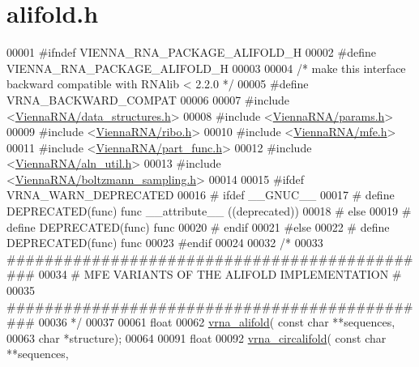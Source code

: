 \hypertarget{alifold_8h_source}{}\section{alifold.\+h}
\label{alifold_8h_source}

\begin{DoxyCode}
00001 \textcolor{preprocessor}{#ifndef VIENNA\_RNA\_PACKAGE\_ALIFOLD\_H}
00002 \textcolor{preprocessor}{#define VIENNA\_RNA\_PACKAGE\_ALIFOLD\_H}
00003 
00004 \textcolor{comment}{/* make this interface backward compatible with RNAlib < 2.2.0 */}
00005 \textcolor{preprocessor}{#define VRNA\_BACKWARD\_COMPAT}
00006 
00007 \textcolor{preprocessor}{#include <\hyperlink{data__structures_8h}{ViennaRNA/data\_structures.h}>}
00008 \textcolor{preprocessor}{#include <\hyperlink{params_8h}{ViennaRNA/params.h}>}
00009 \textcolor{preprocessor}{#include <\hyperlink{ribo_8h}{ViennaRNA/ribo.h}>}
00010 \textcolor{preprocessor}{#include <\hyperlink{mfe_8h}{ViennaRNA/mfe.h}>}
00011 \textcolor{preprocessor}{#include <\hyperlink{part__func_8h}{ViennaRNA/part\_func.h}>}
00012 \textcolor{preprocessor}{#include <\hyperlink{aln__util_8h}{ViennaRNA/aln\_util.h}>}
00013 \textcolor{preprocessor}{#include <\hyperlink{boltzmann__sampling_8h}{ViennaRNA/boltzmann\_sampling.h}>}
00014 
00015 \textcolor{preprocessor}{#ifdef VRNA\_WARN\_DEPRECATED}
00016 \textcolor{preprocessor}{# ifdef \_\_GNUC\_\_}
00017 \textcolor{preprocessor}{#  define DEPRECATED(func) func \_\_attribute\_\_ ((deprecated))}
00018 \textcolor{preprocessor}{# else}
00019 \textcolor{preprocessor}{#  define DEPRECATED(func) func}
00020 \textcolor{preprocessor}{# endif}
00021 \textcolor{preprocessor}{#else}
00022 \textcolor{preprocessor}{# define DEPRECATED(func) func}
00023 \textcolor{preprocessor}{#endif}
00024 
00032 \textcolor{comment}{/*}
00033 \textcolor{comment}{##############################################}
00034 \textcolor{comment}{# MFE VARIANTS OF THE ALIFOLD IMPLEMENTATION #}
00035 \textcolor{comment}{##############################################}
00036 \textcolor{comment}{*/}
00037 
00061 \textcolor{keywordtype}{float}
00062 \hyperlink{group__consensus__mfe__fold_ga6c9d3bef3e92c6d423ffac9f981418c1}{vrna\_alifold}( \textcolor{keyword}{const} \textcolor{keywordtype}{char} **sequences,
00063               \textcolor{keywordtype}{char} *structure);
00064 
00091 \textcolor{keywordtype}{float}
00092 \hyperlink{group__consensus__mfe__fold_ga17a1be7490468c29c335ba9bffacba53}{vrna\_circalifold}( \textcolor{keyword}{const} \textcolor{keywordtype}{char} **sequences,

\end{DoxyCode}

